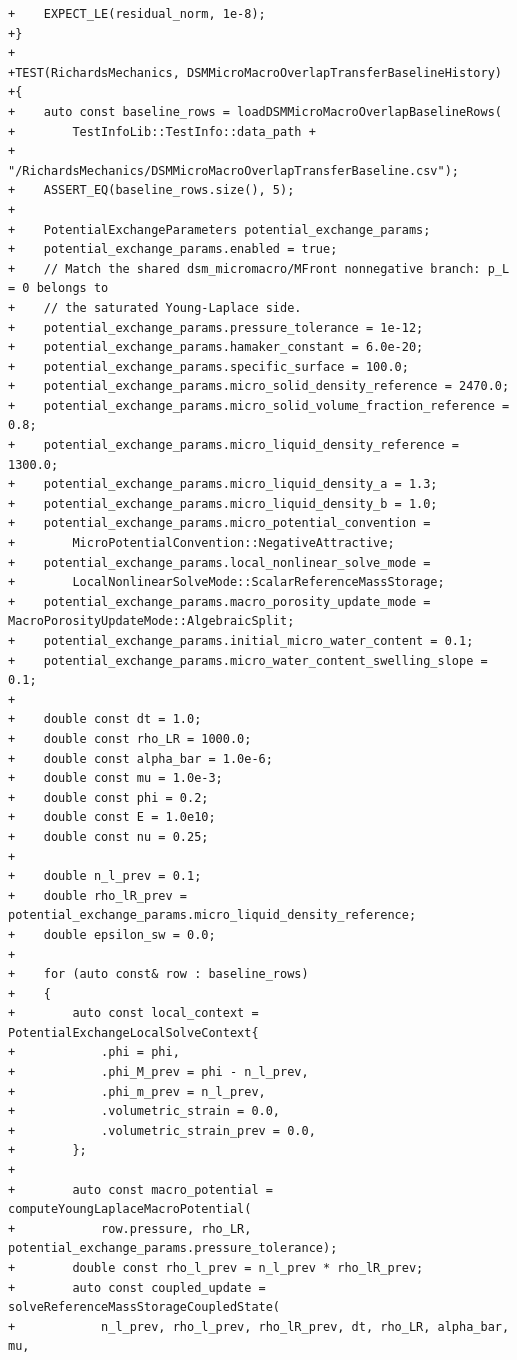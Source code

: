 \documentclass[10pt]{article}
\begin{document}
\begin{lstlisting}
+    EXPECT_LE(residual_norm, 1e-8);
+}
+
+TEST(RichardsMechanics, DSMMicroMacroOverlapTransferBaselineHistory)
+{
+    auto const baseline_rows = loadDSMMicroMacroOverlapBaselineRows(
+        TestInfoLib::TestInfo::data_path +
+        "/RichardsMechanics/DSMMicroMacroOverlapTransferBaseline.csv");
+    ASSERT_EQ(baseline_rows.size(), 5);
+
+    PotentialExchangeParameters potential_exchange_params;
+    potential_exchange_params.enabled = true;
+    // Match the shared dsm_micromacro/MFront nonnegative branch: p_L = 0 belongs to
+    // the saturated Young-Laplace side.
+    potential_exchange_params.pressure_tolerance = 1e-12;
+    potential_exchange_params.hamaker_constant = 6.0e-20;
+    potential_exchange_params.specific_surface = 100.0;
+    potential_exchange_params.micro_solid_density_reference = 2470.0;
+    potential_exchange_params.micro_solid_volume_fraction_reference = 0.8;
+    potential_exchange_params.micro_liquid_density_reference = 1300.0;
+    potential_exchange_params.micro_liquid_density_a = 1.3;
+    potential_exchange_params.micro_liquid_density_b = 1.0;
+    potential_exchange_params.micro_potential_convention =
+        MicroPotentialConvention::NegativeAttractive;
+    potential_exchange_params.local_nonlinear_solve_mode =
+        LocalNonlinearSolveMode::ScalarReferenceMassStorage;
+    potential_exchange_params.macro_porosity_update_mode = MacroPorosityUpdateMode::AlgebraicSplit;
+    potential_exchange_params.initial_micro_water_content = 0.1;
+    potential_exchange_params.micro_water_content_swelling_slope = 0.1;
+
+    double const dt = 1.0;
+    double const rho_LR = 1000.0;
+    double const alpha_bar = 1.0e-6;
+    double const mu = 1.0e-3;
+    double const phi = 0.2;
+    double const E = 1.0e10;
+    double const nu = 0.25;
+
+    double n_l_prev = 0.1;
+    double rho_lR_prev = potential_exchange_params.micro_liquid_density_reference;
+    double epsilon_sw = 0.0;
+
+    for (auto const& row : baseline_rows)
+    {
+        auto const local_context = PotentialExchangeLocalSolveContext{
+            .phi = phi,
+            .phi_M_prev = phi - n_l_prev,
+            .phi_m_prev = n_l_prev,
+            .volumetric_strain = 0.0,
+            .volumetric_strain_prev = 0.0,
+        };
+
+        auto const macro_potential = computeYoungLaplaceMacroPotential(
+            row.pressure, rho_LR, potential_exchange_params.pressure_tolerance);
+        double const rho_l_prev = n_l_prev * rho_lR_prev;
+        auto const coupled_update = solveReferenceMassStorageCoupledState(
+            n_l_prev, rho_l_prev, rho_lR_prev, dt, rho_LR, alpha_bar, mu,

\end{lstlisting}
\end{document}
